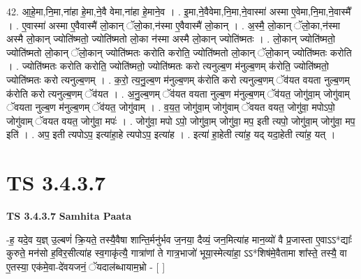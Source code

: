 \documentclass[17pt]{extarticle}
\begin{document}
42. आ॒हे॒मा,नि॒मा,ना॑हा हे॒मा,ने॒वै वेमा,ना॑हा हे॒माने॒व । . इ॒मा,ने॒वैवेमा,नि॒मा,ने॒वास्मा॑ अस्मा ए॒वेमा,नि॒मा,ने॒वास्मै᳚ । . ए॒वास्मा॑ अस्मा ए॒वैवास्मै॑ लो॒कान् ॅलो॒का,न॑स्मा ए॒वैवास्मै॑ लो॒कान् । . अ॒स्मै॒ लो॒कान् ॅलो॒का,न॑स्मा अस्मै लो॒कान् ज्योति॑ष्मतो॒ ज्योति॑ष्मतो लो॒का न॑स्मा अस्मै लो॒कान् ज्योति॑ष्मतः । . लो॒कान् ज्योति॑ष्मतो॒ ज्योति॑ष्मतो लो॒कान् ॅलो॒कान् ज्योति॑ष्मतः करोति करोति॒ ज्योति॑ष्मतो लो॒कान् ॅलो॒कान् ज्योति॑ष्मतः करोति । . ज्योति॑ष्मतः करोति करोति॒ ज्योति॑ष्मतो॒ ज्योति॑ष्मतः करो त्यनुल्ब॒ण म॑नुल्ब॒णम् क॑रोति॒ ज्योति॑ष्मतो॒ ज्योति॑ष्मतः करो त्यनुल्ब॒णम् । . क॒रो॒ त्य॒नु॒ल्ब॒ण म॑नुल्ब॒णम् क॑रोति करो त्यनुल्ब॒णम् ॅव॑यत वयता नुल्ब॒णम् क॑रोति करो त्यनुल्ब॒णम् ॅव॑यत । . अ॒नु॒ल्ब॒णम् ॅव॑यत वयता नुल्ब॒ण म॑नुल्ब॒णम् ॅव॑यत॒ जोगु॑वा॒म् जोगु॑वाम् ॅवयता नुल्ब॒ण म॑नुल्ब॒णम् ॅव॑यत॒ जोगु॑वाम् । . व॒य॒त॒ जोगु॑वा॒म् जोगु॑वाम् ॅवयत वयत॒ जोगु॑वा॒ मपोऽपो॒ जोगु॑वाम् ॅवयत वयत॒ जोगु॑वा॒ मपः॑ । . जोगु॑वा॒ मपो ऽपो॒ जोगु॑वा॒म् जोगु॑वा॒ मप॒ इती त्यपो॒ जोगु॑वा॒म् जोगु॑वा॒ मप॒ इति॑ । . अप॒ इती त्यपोऽप॒ इत्या॑हा॒हे त्यपोऽप॒ इत्या॑ह । . इत्या॑ हा॒हेती त्या॑ह॒ यद् यदा॒हेती त्या॑ह॒ यत् । \newline
\pagebreak
{}

\section{ TS 3.4.3.7 }

\textbf{TS 3.4.3.7 } \newline
\textbf{Samhita Paata} \newline

-ह॒ यदे॒व य॒ज्ञ् उ॒ल्बणं॑ क्रि॒यते॒ तस्यै॒वैषा शान्ति॒र्मनु॑र्भव ज॒नया॒ दैव्यं॒ जन॒मित्या॑ह मान॒व्यो॑ वै प्र॒जास्ता ए॒वाऽऽ*द्याः᳚ कुरुते॒ मन॑सो ह॒विर॒सीत्या॑ह स्व॒गाकृ॑त्यै॒ गात्रा॑णां ते गात्र॒भाजो॑ भूया॒स्मेत्या॑हा॒ ऽऽ*शिष॑मे॒वैतामा शा᳚स्ते॒ तस्यै॒ वा ए॒तस्या॒ एक॑मे॒वा-दे॑वयजनं॒ ॅयदाल॑ब्धायाम॒भ्रो - [  ] \newline
\end{document}
